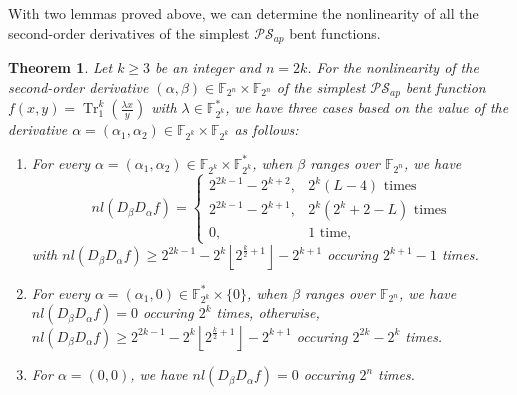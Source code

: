\documentclass{article}
\newcommand{\F}{\mathbb{F}}
\newcommand{\0}{\textbf{0}}
\newcommand{\1}{\textbf{1}}
\newcommand{\TRACE}{\operatorname{Tr}_1^k}
\theoremstyle{plain}
\newtheorem{theorem}{Theorem}
\begin{document}
    With two lemmas proved above, we can determine the nonlinearity of all the second-order derivatives of the simplest $\mathcal{PS}_{ap}$ bent functions.
    \begin{theorem}\label{thm:nl_DaDbf}
        Let $k\ge 3$ be an integer and $n=2k$.
        For the nonlinearity of the second-order derivative $(\alpha,\beta)\in\F_{2^n}\times\F_{2^n}$ of
        the simplest $\mathcal{PS}_{ap}$ bent function $f(x,y)=\TRACE\left(\frac{\lambda x}{y}\right)$ with $\lambda\in\F_{2^k}^*$,
        we have three cases based on the value of the derivative $\alpha=(\alpha_1,\alpha_2)\in\F_{2^k}\times\F_{2^k}$ as follows:
        \begin{enumerate}[label=(\arabic{*})]
            \item For every $\alpha=(\alpha_1,\alpha_2)\in\F_{2^k}\times\F_{2^k}^*$,
            when $\beta$ ranges over $\F_{2^n}$, we have
            \begin{equation}\label{res:nontrivil_nl}
                nl(D_{\beta}D_{\alpha}f)=\begin{cases}
                    2^{2k-1}-2^{k+2},&2^k(L-4)\text{ times}\\
                    2^{2k-1}-2^{k+1},&2^k(2^k+2-L)\text{ times}\\
                    0,&1\text{ time},%
                \end{cases}
            \end{equation}
            with $nl(D_{\beta}D_{\alpha}f)\ge 2^{2k-1}-2^k\left\lfloor 2^{\frac{k}{2}+1}\right\rfloor-2^{k+1}$ occuring $2^{k+1}-1$ times.
            \item For every $\alpha=(\alpha_1,0)\in\F_{2^k}^*\times\{0\}$, when $\beta$ ranges over $\F_{2^n}$,
            we have $nl(D_{\beta}D_{\alpha}f)=0$ occuring $2^k$ times,
            otherwise, $nl(D_{\beta}D_{\alpha}f)\ge 2^{2k-1}-2^k\left\lfloor 2^{\frac{k}{2}+1}\right\rfloor-2^{k+1}$ occuring $2^{2k}-2^k$ times.
            \item For $\alpha=(0,0)$, we have $nl(D_{\beta}D_{\alpha}f) = 0$ occuring $2^n$ times.
        \end{enumerate}
    \end{theorem}
\end{document}
